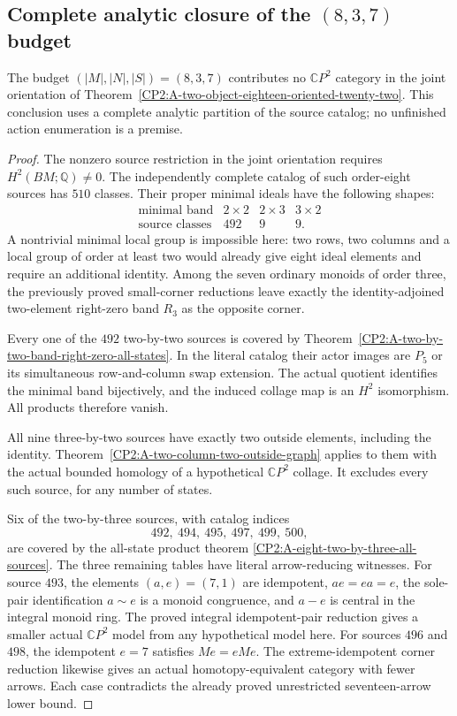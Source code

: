 \subsection{Complete analytic closure of the $(8,3,7)$ budget}

\begin{theorem}
\label{CP2:A-oriented-eighteen-eight-three-seven}
The budget $(|M|,|N|,|S|)=(8,3,7)$ contributes no
$\mathbb CP^2$ category in the joint orientation of
Theorem~\ref{CP2:A-two-object-eighteen-oriented-twenty-two}.
This conclusion uses a complete analytic partition of the source
catalog; no unfinished action enumeration is a premise.
\end{theorem}
\begin{proof}
The nonzero source restriction in the joint orientation requires
$H^2(BM;\mathbb Q)\ne0$.  The independently complete catalog of
such order-eight sources has $510$ classes.  Their proper minimal
ideals have the following shapes:
\[
\begin{array}{c|rrr}
\text{minimal band}&2\times2&2\times3&3\times2\\\hline
\text{source classes}&492&9&9.
\end{array}
\]
A nontrivial minimal local group is impossible here: two rows,
two columns and a local group of order at least two would already
give eight ideal elements and require an additional identity.
Among the seven ordinary monoids of order three, the previously
proved small-corner reductions leave exactly the identity-adjoined
two-element right-zero band $R_3$ as the opposite corner.

Every one of the $492$ two-by-two sources is covered by
Theorem~\ref{CP2:A-two-by-two-band-right-zero-all-states}.
In the literal catalog their actor images are $P_5$ or its
simultaneous row-and-column swap extension.  The actual quotient
identifies the minimal band bijectively, and the induced collage
map is an $H^2$ isomorphism.  All products therefore vanish.

All nine three-by-two sources have exactly two outside elements,
including the identity.  Theorem~\ref{CP2:A-two-column-two-outside-graph}
applies to them with the actual bounded homology of a hypothetical
$\mathbb CP^2$ collage.  It excludes every such source, for any
number of states.

Six of the two-by-three sources, with catalog indices
\[
492,\ 494,\ 495,\ 497,\ 499,\ 500,
\]
are covered by the all-state product theorem
\ref{CP2:A-eight-two-by-three-all-sources}.
The three remaining tables have literal arrow-reducing witnesses.
For source $493$, the elements $(a,e)=(7,1)$ are idempotent,
$ae=ea=e$, the sole-pair identification $a\sim e$ is a monoid
congruence, and $a-e$ is central in the integral monoid ring.
The proved integral idempotent-pair reduction gives a smaller
actual $\mathbb CP^2$ model from any hypothetical model here.
For sources $496$ and $498$, the idempotent $e=7$ satisfies
$Me=eMe$.  The extreme-idempotent corner reduction likewise
gives an actual homotopy-equivalent category with fewer arrows.
Each case contradicts the already proved unrestricted
seventeen-arrow lower bound.


\end{proof}
